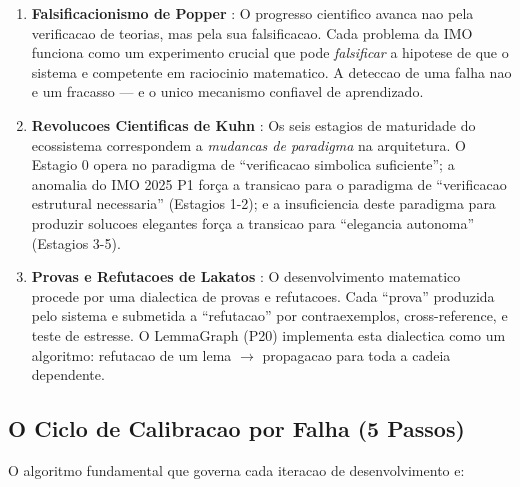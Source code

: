 \documentclass[5p]{elsarticle}
\begin{document}
\begin{enumerate}[label=(\arabic*)]
  \item \textbf{Falsificacionismo de Popper} \cite{popper1959}: O progresso
    cientifico avanca nao pela verificacao de teorias, mas pela sua
    falsificacao. Cada problema da IMO funciona como um experimento crucial
    que pode \textit{falsificar} a hipotese de que o sistema e competente
    em raciocinio matematico. A deteccao de uma falha nao e um fracasso ---
    e o unico mecanismo confiavel de aprendizado.

  \item \textbf{Revolucoes Cientificas de Kuhn} \cite{kuhn1962}: Os seis
    estagios de maturidade do ecossistema correspondem a \textit{mudancas de
    paradigma} na arquitetura. O Estagio 0 opera no paradigma de ``verificacao
    simbolica suficiente''; a anomalia do IMO 2025 P1 força a transicao para
    o paradigma de ``verificacao estrutural necessaria'' (Estagios 1-2); e a
    insuficiencia deste paradigma para produzir solucoes elegantes força a
    transicao para ``elegancia autonoma'' (Estagios 3-5).

  \item \textbf{Provas e Refutacoes de Lakatos} \cite{lakatos1976}: O
    desenvolvimento matematico procede por uma dialectica de provas e
    refutacoes. Cada ``prova'' produzida pelo sistema e submetida a
    ``refutacao'' por contraexemplos, cross-reference, e teste de estresse.
    O LemmaGraph (P20) implementa esta dialectica como um algoritmo:
    refutacao de um lema $\to$ propagacao para toda a cadeia dependente.
\end{enumerate}

\subsection{O Ciclo de Calibracao por Falha (5 Passos)}

O algoritmo fundamental que governa cada iteracao de desenvolvimento e:
\end{document}
